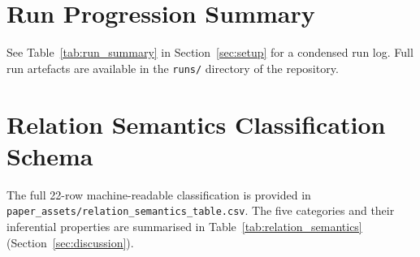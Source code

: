 \documentclass[11pt,a4paper]{article}
\begin{document}
\section{Run Progression Summary}
\label{app:runs}

See Table~\ref{tab:run_summary} in Section~\ref{sec:setup} for a condensed run log.
Full run artefacts are available in the \texttt{runs/} directory of the repository.

\section{Relation Semantics Classification Schema}
\label{app:semantics}

The full 22-row machine-readable classification is provided in
\texttt{paper\_assets/relation\_semantics\_table.csv}.
The five categories and their inferential properties are summarised in
Table~\ref{tab:relation_semantics} (Section~\ref{sec:discussion}).
\end{document}
